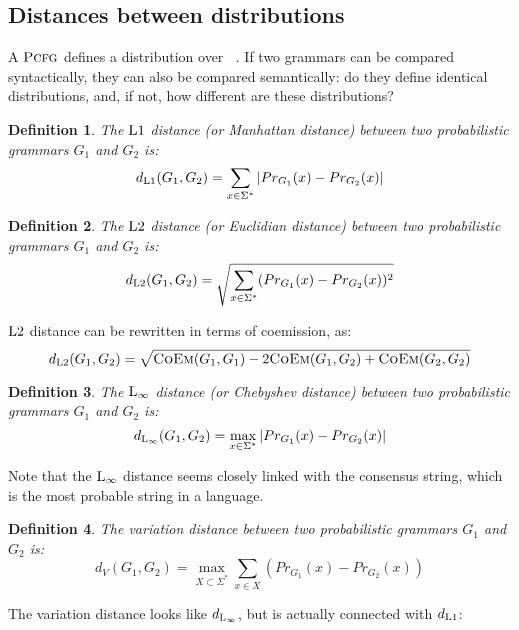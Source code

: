 \documentclass[submission]{eptcs} \usepackage{breakurl}             \usepackage[english]{babel}
\newtheorem{definition}{Definition}
\providecommand{\Lone}{\textup{L1}}
\providecommand{\Ltwo}{\textup{L2}}
\providecommand{\Linf}{\textup{L}\ensuremath{_{\infty}}}
\providecommand{\PCFG}{\ensuremath{\textsc{Pcfg}}}
\providecommand{\Prob}{\ensuremath{Pr}}
\providecommand{\Sigmastar}{\ensuremath{\mathop{\Sigma^{\star}}}}
\providecommand{\COEM}{\ensuremath{\textsc{CoEm}}}
\begin{document}
\subsection{Distances between distributions}
A $\PCFG$ defines a distribution over $\Sigmastar$. If two grammars can be compared syntactically, they can also be compared semantically: do they define identical distributions, and, if not, how different are these distributions?
\begin{definition}
The $\Lone$ distance (or Manhattan distance) between two probabilistic grammars $G_1$ and $G_2$ is:
\begin{equation*}
d_{\Lone}(G_1,G_2)=\sum_{x\in\Sigma^*}|\Prob_{G_1}(x)-\Prob_{G_2}(x)|
\end{equation*}
\end{definition}
\begin{definition}
The $\Ltwo$ distance (or Euclidian distance) between two probabilistic grammars $G_1$ and $G_2$ is:
\begin{equation*}
d_{\Ltwo}(G_1,G_2)=\sqrt{\sum_{x\in\Sigma^*}(\Prob_{G_1}(x)-\Prob_{G_2}(x))^2}
\end{equation*}
\end{definition}
$\Ltwo$ distance can be rewritten in terms of coemission, as:
\begin{equation*}\label{eq:L2}
d_{\Ltwo}(G_1,G_2)=\sqrt{\COEM(G_1,G_1)-2\COEM(G_1,G_2)+\COEM(G_2,G_2)}
\end{equation*}

\begin{definition}
The $\Linf$ distance (or Chebyshev distance) between two probabilistic grammars $G_1$ and $G_2$ is:
\begin{equation*}
d_{\Linf}(G_1,G_2)=\max_{x\in\Sigma^*}|\Prob_{G_1}(x)-\Prob_{G_2}(x)|
\end{equation*}
\end{definition}
Note that the $\Linf$ distance seems closely linked with the consensus string, which is the most probable string in a language.
\begin{definition}
The \emph{variation distance} between two probabilistic grammars $G_1$ and $G_2$ is:
\begin{equation*}
d_{V}(G_1,G_2)=\max_{X\subset\Sigma^*}\sum_{x\in X}(\Prob_{G_1}(x)-\Prob_{G_2}(x))
\end{equation*}
\end{definition}
The variation distance looks like $d_{\Linf}$, but is actually connected with $d_{\Lone}$:
\end{document}
